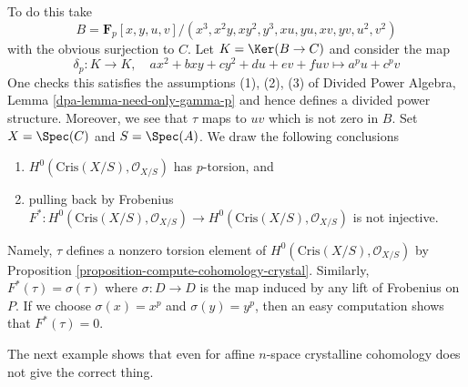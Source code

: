 \begin{example}
To do this take
$$
B = \mathbf{F}_p[x, y, u, v]/(x^3, x^2y, xy^2, y^3, xu, yu, xv, yv, u^2, v^2)
$$
with the obvious surjection to $C$. Let $K = \Ker(B \to C)$ and
consider the map
$$
\delta_p : K \longrightarrow K,\quad
ax^2 + bxy + cy^2 + du + ev + fuv \longmapsto a^pu + c^pv
$$
One checks this satisfies the assumptions (1), (2), (3) of
Divided Power Algebra, Lemma \ref{dpa-lemma-need-only-gamma-p}
and hence defines a divided power structure. Moreover,
we see that $\tau$ maps to $uv$ which is not zero in $B$.
Set $X = \Spec(C)$ and $S = \Spec(A)$.
We draw the following conclusions
\begin{enumerate}
\item $H^0(\text{Cris}(X/S), \mathcal{O}_{X/S})$ has $p$-torsion, and
\item pulling back by Frobenius $F^* : H^0(\text{Cris}(X/S), \mathcal{O}_{X/S})
\to H^0(\text{Cris}(X/S), \mathcal{O}_{X/S})$ is not injective.
\end{enumerate}
Namely, $\tau$ defines a nonzero torsion element of
$H^0(\text{Cris}(X/S), \mathcal{O}_{X/S})$ by
Proposition \ref{proposition-compute-cohomology-crystal}.
Similarly, $F^*(\tau) = \sigma(\tau)$ where $\sigma : D \to D$ is the
map induced by any lift of Frobenius on $P$. If we choose $\sigma(x) = x^p$
and $\sigma(y) = y^p$, then an easy computation shows that $F^*(\tau) = 0$.
\end{example}

\noindent
The next example shows that even for affine $n$-space crystalline
cohomology does not give the correct thing.

